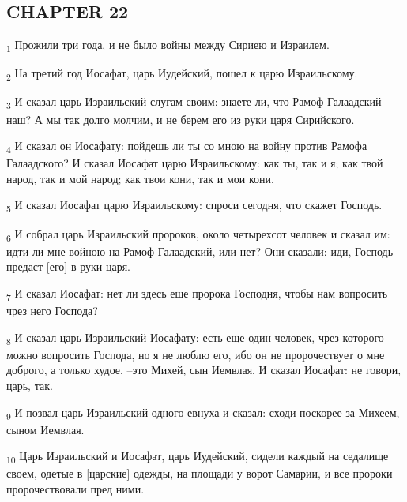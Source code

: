 \subsection{CHAPTER 22}
\begin{tcolorbox}
\textsubscript{1} Прожили три года, и не было войны между Сириею и Израилем.
\end{tcolorbox}
\begin{tcolorbox}
\textsubscript{2} На третий год Иосафат, царь Иудейский, пошел к царю Израильскому.
\end{tcolorbox}
\begin{tcolorbox}
\textsubscript{3} И сказал царь Израильский слугам своим: знаете ли, что Рамоф Галаадский наш? А мы так долго молчим, и не берем его из руки царя Сирийского.
\end{tcolorbox}
\begin{tcolorbox}
\textsubscript{4} И сказал он Иосафату: пойдешь ли ты со мною на войну против Рамофа Галаадского? И сказал Иосафат царю Израильскому: как ты, так и я; как твой народ, так и мой народ; как твои кони, так и мои кони.
\end{tcolorbox}
\begin{tcolorbox}
\textsubscript{5} И сказал Иосафат царю Израильскому: спроси сегодня, что скажет Господь.
\end{tcolorbox}
\begin{tcolorbox}
\textsubscript{6} И собрал царь Израильский пророков, около четырехсот человек и сказал им: идти ли мне войною на Рамоф Галаадский, или нет? Они сказали: иди, Господь предаст [его] в руки царя.
\end{tcolorbox}
\begin{tcolorbox}
\textsubscript{7} И сказал Иосафат: нет ли здесь еще пророка Господня, чтобы нам вопросить чрез него Господа?
\end{tcolorbox}
\begin{tcolorbox}
\textsubscript{8} И сказал царь Израильский Иосафату: есть еще один человек, чрез которого можно вопросить Господа, но я не люблю его, ибо он не пророчествует о мне доброго, а только худое, --это Михей, сын Иемвлая. И сказал Иосафат: не говори, царь, так.
\end{tcolorbox}
\begin{tcolorbox}
\textsubscript{9} И позвал царь Израильский одного евнуха и сказал: сходи поскорее за Михеем, сыном Иемвлая.
\end{tcolorbox}
\begin{tcolorbox}
\textsubscript{10} Царь Израильский и Иосафат, царь Иудейский, сидели каждый на седалище своем, одетые в [царские] одежды, на площади у ворот Самарии, и все пророки пророчествовали пред ними.
\end{tcolorbox}

